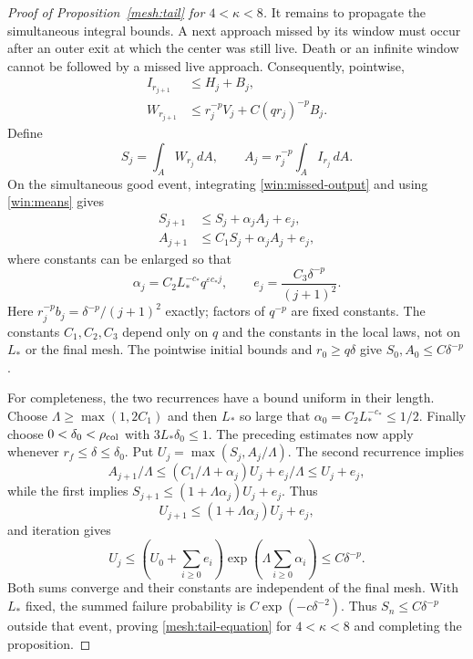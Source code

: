 \begin{proof}[Proof of Proposition~\ref{mesh:tail} for $4<\kappa<8$]
It remains to propagate the simultaneous integral bounds.  A next
approach missed by its window must occur after an outer exit at which
the center was still live.  Death or an infinite window cannot be
followed by a missed live approach.  Consequently, pointwise,
\begin{equation}
 \begin{split}
 I_{r_{j+1}}&\le H_j+B_j,\\
 W_{r_{j+1}}&\le r_j^{-p}V_j+C(qr_j)^{-p}B_j.
 \end{split}
 \label{win:missed-output}
\end{equation}
Define
\[
 S_j=\int_A W_{r_j}\,dA,\qquad
 A_j=r_j^{-p}\int_A I_{r_j}\,dA.
\]
On the simultaneous good event, integrating
\eqref{win:missed-output} and using \eqref{win:means} gives
\begin{equation}
 \begin{split}
 S_{j+1}&\le S_j+\alpha_j A_j+e_j,\\
 A_{j+1}&\le C_1 S_j+\alpha_j A_j+e_j,
 \end{split}
 \label{win:recurrences}
\end{equation}
where constants can be enlarged so that
\[
 \alpha_j=C_2L_*^{-c_*}q^{\varepsilon c_*j},\qquad
 e_j=\frac{C_3\delta^{-p}}{(j+1)^2}.
\]
Here $r_j^{-p}b_j=\delta^{-p}/(j+1)^2$ exactly; factors of $q^{-p}$
are fixed constants.  The constants $C_1,C_2,C_3$ depend only on
$q$ and the constants in the local laws, not on $L_*$ or the final mesh.
The pointwise initial bounds and
$r_0\ge q\delta$ give $S_0,A_0\le C\delta^{-p}$.

For completeness, the two recurrences have a bound uniform in their
length.  Choose $\Lambda\ge\max(1,2C_1)$ and then $L_*$ so large that
$\alpha_0=C_2L_*^{-c_*}\le1/2$.  Finally choose
$0<\delta_0<\rho_{\rm col}$ with $3L_*\delta_0\le1$.  The preceding
estimates now apply whenever $r_f\le\delta\le\delta_0$.
Put $U_j=\max(S_j,A_j/\Lambda)$.  The second recurrence
implies
\[
 A_{j+1}/\Lambda
 \le(C_1/\Lambda+\alpha_j)U_j+e_j/\Lambda\le U_j+e_j,
\]
while the first implies
$S_{j+1}\le(1+\Lambda\alpha_j)U_j+e_j$.  Thus
\[
 U_{j+1}\le(1+\Lambda\alpha_j)U_j+e_j,
\]
and iteration gives
\[
 U_j\le\left(U_0+\sum_{i\ge0}e_i\right)
          \exp\left(\Lambda\sum_{i\ge0}\alpha_i\right)
       \le C\delta^{-p}.
\]
Both sums converge and their constants are independent of the final
mesh.  With $L_*$ fixed, the summed failure probability is
$C\exp(-c\delta^{-2})$.  Thus $S_n\le C\delta^{-p}$ outside that event,
proving \eqref{mesh:tail-equation} for $4<\kappa<8$ and completing the proposition.
\end{proof}
